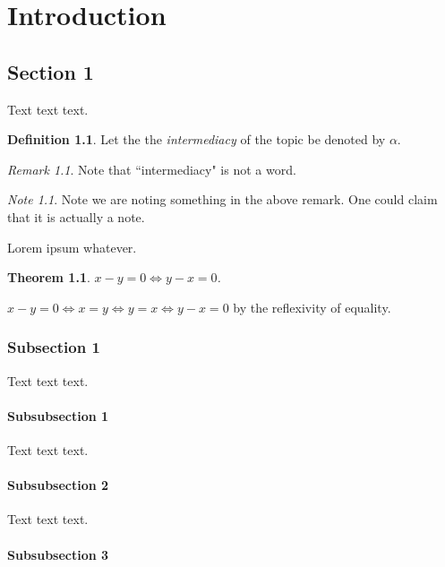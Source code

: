 \documentclass[twoside, titlepage]{amsbook}
\makeatletter
\theoremstyle{plain} %
\newtheorem{thm}{Theorem}[section]
\theoremstyle{definition}
\newtheorem{defn}{Definition}[section]
\theoremstyle{remark}
\newtheorem*{rem}{Remark}
\newtheorem*{note}{Note}
\theoremstyle{notation}
\renewenvironment{proof}[1][\proofname]{\par
	\pushQED{\qed}%
	\normalfont \topsep6\p@\@plus6\p@\relax
	\trivlist
	\item\relax
	{\itshape
		#1\@addpunct{.}}\hspace\labelsep\ignorespaces
}{%
\popQED\endtrivlist\@endpefalse
}
\makeatother
\begin{document}
	\chapter{Introduction}
	
		\section{Section 1}
		
			Text text text.  
			
			\begin{defn}
				Let the the \emph{intermediacy} of the topic be denoted by $\alpha$.
			\end{defn}
			
			\begin{rem}
				Note that ``intermediacy" is not a word.
			\end{rem}
			
			\begin{note}
				Note we are noting something in the above remark.  One could claim that it is actually a note.
			\end{note}
			
			Lorem ipsum whatever.
			
			\begin{thm}
				$x - y = 0 \iff y - x = 0$.
			\end{thm}
			\begin{proof}
				$x - y = 0 \iff x = y \iff y = x \iff y - x = 0$ by the reflexivity of equality.
			\end{proof}
			
			\subsection{Subsection 1}
			
				Text text text.
			
				\subsubsection{Subsubsection 1}
				
					Text text text.
			
				\subsubsection{Subsubsection 2}
				
					Text text text.
			
				\subsubsection{Subsubsection 3}
				
\end{document}
